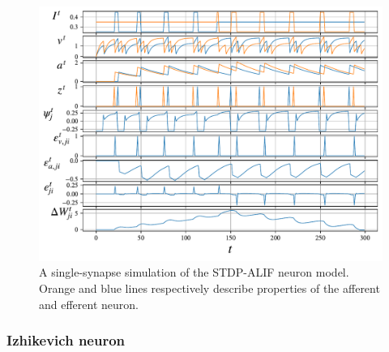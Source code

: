 	        \begin{figure}[!ht]
	            \centering
	            \includegraphics[width=\linewidth]{gfx/stdpalif}
	            \caption[Single-synapse STDP-ALIF simulation]{A single-synapse simulation of the STDP-ALIF neuron model. Orange and blue lines respectively describe properties of the afferent and efferent neuron.}
	            \label{fig:stdpalif}
	        \end{figure}

		\subsubsection{Izhikevich neuron}\label{sec:izhikevich}

